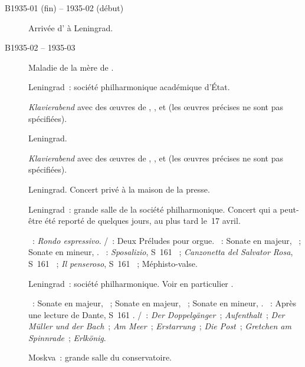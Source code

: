 \begin{description}
 \item[B1935-01 (fin) -- 1935-02 (début)]
 Arrivée d'\ESofronitskaya{} à Leningrad.
 \item[B1935-02 -- 1935-03]
 Maladie de la mère de \VSofronitsky{}.
 \item[]
 Leningrad~: société philharmonique académique d'\hbox{État}.

 \foreignlanguage{german}{\emph{Klavierabend}} avec des œuvres de
 \GHaendel{}, \JBach{}, \RSchumann{} et \FChopin{} (les œuvres précises ne
 sont pas spécifiées).
 \item[]
 Leningrad.

 \foreignlanguage{german}{\emph{Klavierabend}} avec des œuvres de
 \GHaendel{}, \JBach{}, \RSchumann{} et \FChopin{} (les œuvres précises ne
 sont pas spécifiées).
 \item[]
 Leningrad.
 Concert privé à la maison de la presse.
 \item[]
 Leningrad~: grande salle de la société philharmonique.
 Concert qui a peut-être été reporté de quelques jours, au plus tard le~17
 avril.

 \textsc{\CBach{}}~: \emph{Rondo espressivo}.
 \textsc{\JBach{}/\Busoni{}}~: Deux Préludes pour orgue.
 \textsc{\Beethoven{}}~: Sonate en \kD majeur,  ~; Sonate
 en \kC mineur, .
 \textsc{\Liszt{}}~: \emph{Sposalizio}, S~161 ~; \emph{Canzonetta
 del Salvator Rosa}, S~161 ~; \emph{Il penseroso}, S~161
 ~; Méphisto-valse.
 \item[]
 Leningrad~: société philharmonique.
 Voir en particulier \citet[p.~427]{Milshteyn82a}.

 \textsc{\Beethoven{}}~: Sonate en \kD majeur, ~; Sonate en \kF
 \Sharp majeur, ~; Sonate en \kC \Sharp mineur, 
 .
 \textsc{\Liszt{}}~: Après une lecture de Dante, S~161 .
 \textsc{\Schubert{}/\Liszt{}}~: \emph{Der Doppelgänger}~;
 \emph{Aufenthalt}~; \emph{Der Müller und der Bach}~; \emph{Am Meer}~;
 \emph{Erstarrung}~; \emph{Die Post}~; \emph{Gretchen am Spinnrade}~;
 \emph{Erlkönig}.
 \item[]
 Moskva~: grande salle du conservatoire.


\end{description}
